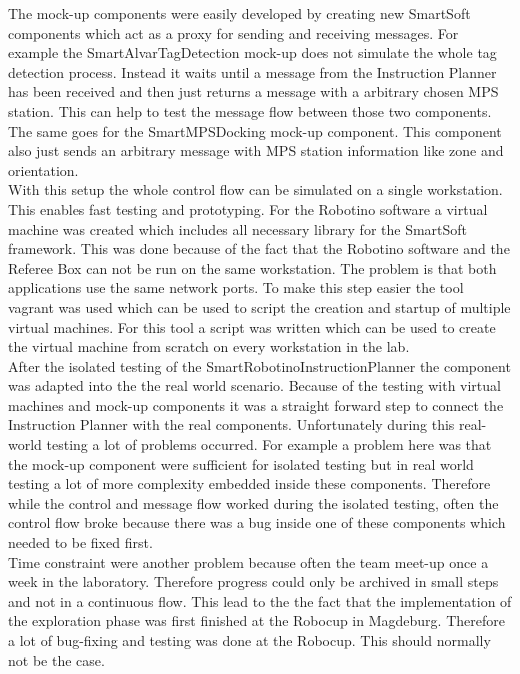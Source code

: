 The mock-up components were easily developed by creating new SmartSoft components which act as a proxy for sending and receiving messages. For example the SmartAlvarTagDetection mock-up does not simulate the whole tag detection process. Instead it waits until a message from the Instruction Planner has been received and then just returns a message with a arbitrary chosen MPS station. This can help to test the message flow between those two components. The same goes for the SmartMPSDocking mock-up component. This component also just sends an arbitrary message with MPS station information like zone and orientation. \\

With this setup the whole control flow can be simulated on a single workstation. This enables fast testing and prototyping. For the Robotino software a virtual machine was created which includes all necessary library for the SmartSoft framework. This was done because of the fact that the Robotino software and the Referee Box can not be run on the same workstation. The problem is that both applications use the same network ports. To make this step easier the tool vagrant was used which can be used to script the creation and startup of multiple virtual machines. For this tool a script was written which can be used to create the virtual machine from scratch on every workstation in the lab. \\


After the isolated testing of the SmartRobotinoInstructionPlanner the component was adapted into the the real world scenario. Because of the testing with virtual machines and mock-up components it was a straight forward step to connect the Instruction Planner with the real components. Unfortunately during this real-world testing a lot of problems occurred. For example a problem here was that the mock-up component were sufficient for isolated testing but in real world testing a lot of more complexity embedded inside these components. Therefore while the control and message flow worked during the isolated testing, often the control flow broke because there was a bug inside one of these components which needed to be fixed first. \\

Time constraint were another problem because often the team meet-up once a week in the laboratory. Therefore progress could only be archived in small steps and not in a continuous flow. This lead to the the fact that the implementation of the exploration phase was first finished at the Robocup in Magdeburg. Therefore a lot of bug-fixing and testing was done at the Robocup. This should normally not be the case.  


